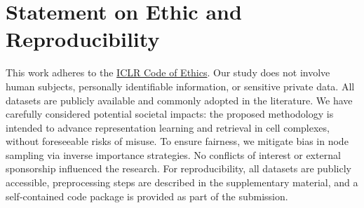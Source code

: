 \section{Statement on Ethic and Reproducibility } 
This work adheres to the \href{https://iclr.cc/public/CodeOfEthics}{ICLR Code of Ethics}. 
Our study does not involve human subjects, personally identifiable information, or sensitive private data. 
All datasets are publicly available and commonly adopted in the literature. 
We have carefully considered potential societal impacts: the proposed methodology is intended to advance representation learning and retrieval in cell complexes, without foreseeable risks of misuse. 
To ensure fairness, we mitigate bias in node sampling via inverse importance strategies. 
No conflicts of interest or external sponsorship influenced the research. 
For reproducibility, all datasets are publicly accessible, preprocessing steps are described in the supplementary material, and a self-contained code package is provided as part of the submission.
